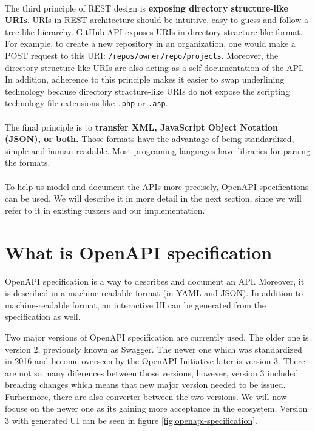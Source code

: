 \paragraph{}
The third principle of REST design is \textbf{exposing directory structure-like URIs}. URIs in REST architecture should be intuitive, easy to guess and follow a tree-like hierarchy. GitHub API exposes URIs in directory stracture-like format. For example, to create a new repository in an organization, one would make a POST request to this URI: \texttt{/repos/{owner}/{repo}/projects}. Moreover, the directory structure-like URIs are also acting as a self-documentation of the API. In addition, adherence to this principle makes it easier to swap underlining technology because directory stracture-like URIs do not expose the scripting technology file extensions like \texttt{.php} or \texttt{.asp}.

\paragraph{}
The final principle is to \textbf{transfer XML, JavaScript Object Notation (JSON), or both.} Those formats have the advantage of being standardized, simple and human readable. Most programing languages have libraries for parsing the formats.

\paragraph{}
To help us model and document the APIs more precisely, OpenAPI specifications can be used. We will describe it in more detail in the next section, since we will refer to it in existing fuzzers and our implementation.


\section{What is OpenAPI specification}
OpenAPI specification is a way to describes and document an API. Moreover, it is described in a  machine-readable format (in YAML and JSON). In addition to machine-readable format, an interactive UI can be generated from the specification as well.

Two major versions of OpenAPI specification are currently used. The older one is version 2, previously known as Swagger. The newer one which was standardized in 2016 and become overseen by the OpenAPI Initiative \cite{openapi2020main} later is version 3. There are not so many diferences between those versions, however, version 3 included breaking changes which means that new major version needed to be issued. Furhermore, there are also converter between the two versions. We will now focuse on the newer one as its gaining more acceptance in the ecosystem. Version 3 with generated UI can be seen in figure \ref{fig:openapi-specification}.

